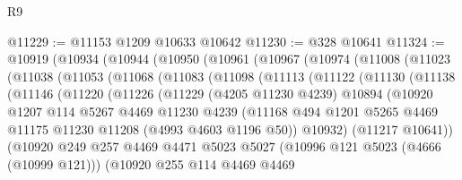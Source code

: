 \begin{lexlean}{R9}
\begin{coremodule}
@11229 := @11153 @1209 @10633 @10642
@11230 := @328 @10641
@11324 := @10919
    (@10934
      (@10944
        (@10950
          (@10961
            (@10967
              (@10974
                (@11008
                  (@11023
                    (@11038
                      (@11053
                        (@11068
                          (@11083
                            (@11098
                              (@11113
                                (@11122
                                  (@11130
                                    (@11138
                                      (@11146
                                        (@11220
                                          (@11226
                                            (@11229
                                              (@4205 @11230 @4239)
                                              @10894
                                              (@10920
                                                @1207
                                                @114
                                                @5267
                                                @4469
                                                @11230
                                                @4239
                                                (@11168
                                                  @494
                                                  @1201
                                                  @5265
                                                  @4469
                                                  @11175
                                                  @11230
                                                  @11208
                                                  (@4993 @4603 @1196 @50))
                                                @10932)
                                              (@11217 @10641))
                                            (@10920
                                              @249
                                              @257
                                              @4469
                                              @4471
                                              @5023
                                              @5027
                                              (@10996 @121 @5023 (@4666 (@10999 @121)))
                                              (@10920
                                                @255
                                                @114
                                                @4469
                                                @4469

\end{coremodule}
\end{lexlean}
